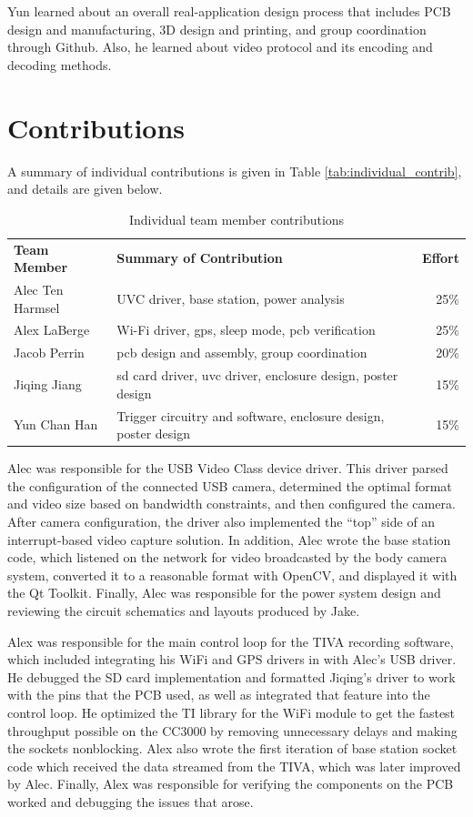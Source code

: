 \documentclass[12pt]{article}
\begin{document}
Yun learned about an overall real-application design process that includes PCB
design and manufacturing, 3D design and printing, and group coordination
through Github. Also, he learned about video protocol and its encoding and
decoding methods.

\section{Contributions}
A summary of individual contributions is given in Table
\ref{tab:individual_contrib}, and details are given below.

\begin{table}[h]
    \centering
    \caption{Individual team member contributions}
    \begin{tabular}{llr}
        \textbf{Team Member} & \textbf{Summary of Contribution} & \textbf{Effort}\\
        Alec Ten Harmsel & UVC driver, base station, power analysis & 25\%\\
        Alex LaBerge & Wi-Fi driver, \gls{gps}, sleep mode, \gls{pcb} verification & 25\%\\
        Jacob Perrin & \gls{pcb} design and assembly, group coordination & 20\%\\
        Jiqing Jiang & \gls{sd} card driver, \gls{uvc} driver, enclosure design, poster design & 15\%\\
        Yun Chan Han & Trigger circuitry and software, enclosure design, poster design & 15\%\\
    \end{tabular}
\end{table}

Alec was responsible for the USB Video Class device driver. This driver parsed
the configuration of the connected USB camera, determined the optimal format
and video size based on bandwidth constraints, and then configured the camera.
After camera configuration, the driver also implemented the “top” side of an
interrupt-based video capture solution. In addition, Alec wrote the base
station code, which listened on the network for video broadcasted by the body
camera system, converted it to a reasonable format with OpenCV, and displayed
it with the Qt Toolkit. Finally, Alec was responsible for the power system
design and reviewing the circuit schematics and layouts produced by Jake.

Alex was responsible for the main control loop for the TIVA recording software,
which included integrating his WiFi and GPS drivers in with Alec's USB driver.
He debugged the SD card implementation and formatted Jiqing's driver to work with
the pins that the PCB used, as well as integrated that feature into the control loop. 
He optimized the TI library for the WiFi module to get the fastest throughput
possible on the CC3000 by removing unnecessary delays and making the sockets
nonblocking. Alex also wrote the first iteration of base station socket code
which received the data streamed from the TIVA, which was later improved by
Alec. Finally, Alex was responsible for verifying the components on the PCB
worked and debugging the issues that arose.
\end{document}
